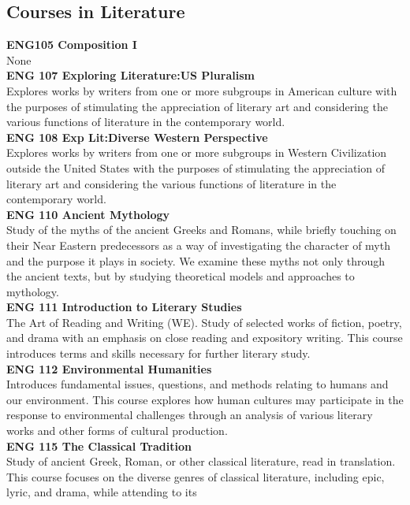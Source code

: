 \documentclass[
  letterpaper,
]{scrbook}
\begin{document}
\subsection{Courses in Literature}\label{sec-courses-in-english}

\textbf{ENG105 Composition I}\\
None\\
\textbf{ENG 107 Exploring Literature:US Pluralism}\\
Explores works by writers from one or more subgroups in American culture
with the purposes of stimulating the appreciation of literary art and
considering the various functions of literature in the contemporary
world.\\
\textbf{ENG 108 Exp Lit:Diverse Western Perspective}\\
Explores works by writers from one or more subgroups in Western
Civilization outside the United States with the purposes of stimulating
the appreciation of literary art and considering the various functions
of literature in the contemporary world.\\
\textbf{ENG 110 Ancient Mythology}\\
Study of the myths of the ancient Greeks and Romans, while briefly
touching on their Near Eastern predecessors as a way of investigating
the character of myth and the purpose it plays in society. We examine
these myths not only through the ancient texts, but by studying
theoretical models and approaches to mythology.\\
\textbf{ENG 111 Introduction to Literary Studies}\\
The Art of Reading and Writing (WE). Study of selected works of fiction,
poetry, and drama with an emphasis on close reading and expository
writing. This course introduces terms and skills necessary for further
literary study.\\
\textbf{ENG 112 Environmental Humanities}\\
Introduces fundamental issues, questions, and methods relating to humans
and our environment. This course explores how human cultures may
participate in the response to environmental challenges through an
analysis of various literary works and other forms of cultural
production.\\
\textbf{ENG 115 The Classical Tradition}\\
Study of ancient Greek, Roman, or other classical literature, read in
translation. This course focuses on the diverse genres of classical
literature, including epic, lyric, and drama, while attending to its
\end{document}
